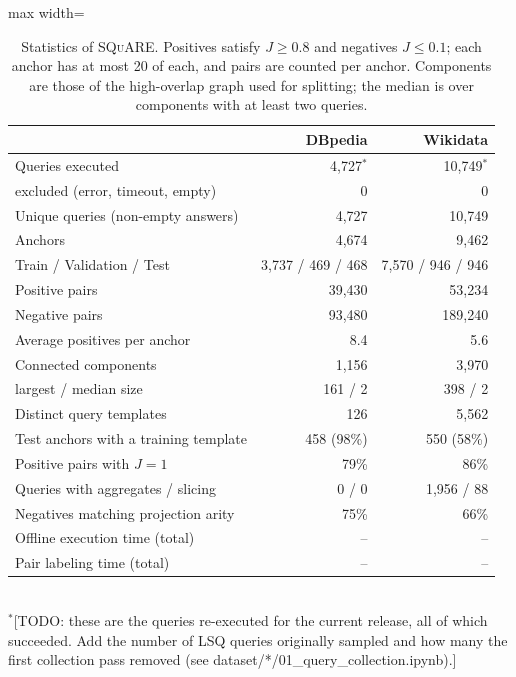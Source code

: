 \documentclass[runningheads]{llncs}
\newcommand{\squareds}{\textsc{SQuARE}}
\newcommand{\hp}[1]{{\color{red!75!black}#1}}
\begin{document}
\begin{table}[t]
\centering
\caption{Statistics of \squareds{}. Positives satisfy $J \geq 0.8$ and
negatives $J \leq 0.1$; each anchor has at most 20 of each, and pairs are
counted per anchor. Components are those of the high-overlap graph used for
splitting; the median is over components with at least two queries.}
\label{tab:dataset_square}
\small
\setlength{\tabcolsep}{6pt}
\renewcommand{\arraystretch}{1.1}
\begin{adjustbox}{max width=\textwidth}
\begin{tabular}{lrr}
\toprule
& \textbf{DBpedia} & \textbf{Wikidata} \\
\midrule
Queries executed & 4{,}727\hp{$^\ast$} & 10{,}749\hp{$^\ast$} \\
\quad excluded (error, timeout, empty) & 0 & 0 \\
Unique queries (non-empty answers) & 4{,}727 & 10{,}749 \\
Anchors & 4{,}674 & 9{,}462 \\
\quad Train / Validation / Test & 3{,}737 / 469 / 468 & 7{,}570 / 946 / 946 \\
Positive pairs & 39{,}430 & 53{,}234 \\
Negative pairs & 93{,}480 & 189{,}240 \\
Average positives per anchor & 8.4 & 5.6 \\
\midrule
Connected components & 1{,}156 & 3{,}970 \\
\quad largest / median size & 161 / 2 & 398 / 2 \\
Distinct query templates & 126 & 5{,}562 \\
Test anchors with a training template & 458 (98\%) & 550 (58\%) \\
Positive pairs with $J = 1$ & 79\% & 86\% \\
Queries with aggregates / slicing & 0 / 0 & 1{,}956 / 88 \\
Negatives matching projection arity & 75\% & 66\% \\
\midrule
Offline execution time (total) & \hp{--} & \hp{--} \\
Pair labeling time (total) & \hp{--} & \hp{--} \\
\bottomrule
\end{tabular}
\end{adjustbox}
\\[2pt]{\scriptsize\hp{$^\ast$[TODO: these are the queries re-executed for the
current release, all of which succeeded. Add the number of LSQ queries
originally sampled and how many the first collection pass removed (see
dataset/*/01\_query\_collection.ipynb).]}}
\end{table}
\end{document}

